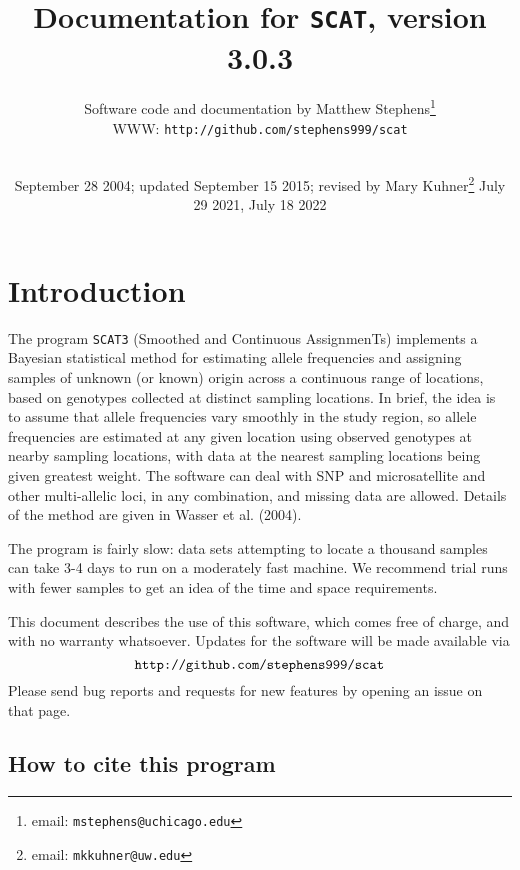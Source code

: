 \documentclass[10pt,titlepage,times,letterpaper]{article}
\def\SCAT{{\tt SCAT3} }
\begin{document}
\title{Documentation for {\tt SCAT}, version 3.0.3}

\author{
Software code and documentation by Matthew Stephens\footnote{email: {\tt mstephens@uchicago.edu}} \\
WWW: {\tt http://github.com/stephens999/scat}\\
\\
}

\date{September 28 2004; updated September 15 2015; revised by Mary Kuhner\footnote{email:  {\tt mkkuhner@uw.edu}} July 29 2021, July 18 2022}


\maketitle

\tableofcontents
\vfil\eject
\section{Introduction}

The program \SCAT (Smoothed and Continuous AssignmenTs)
implements a Bayesian statistical method for estimating allele
frequencies and assigning samples of unknown (or known) origin across
a continuous range of locations, based on genotypes collected at
distinct sampling locations.  In brief, the idea is to assume that allele
frequencies vary smoothly in the study region, so allele frequencies
are estimated at any given location using observed genotypes at
nearby sampling locations, with data at the nearest sampling
locations being given greatest weight.  The software can deal with SNP
and microsatellite and other multi-allelic loci, in any combination,
and missing data are allowed. Details of the method are given in
Wasser et al. (2004).

The program is fairly slow:  data sets attempting to locate a thousand
samples can take 3-4 days to run on a moderately fast machine.  We
recommend trial runs with fewer samples to get an idea of the time and
space requirements.

This document describes the use of this software, which comes free of
charge, and with no warranty whatsoever.  Updates for the software
will be made available via
$$\text{{\tt http://github.com/stephens999/scat}}$$
Please send bug reports and requests for new features by opening an issue on that page.

\subsection{How to cite this program}
\end{document}
